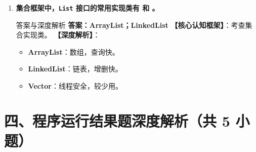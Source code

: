 \documentclass[12pt, a4paper]{ctexart}
\newcommand{\code}[1]{\texttt{#1}}
\newcommand{\blank}{\underline{\hspace{2em}}}
\begin{document}
\begin{enumerate}[label=\textbf{\arabic*.}, leftmargin=*, itemsep=1.5em]
\item \textbf{集合框架中，\code{List} 接口的常用实现类有 \blank 和 \blank。}
\begin{bluebox}{答案与深度解析}
\textbf{答案：ArrayList；LinkedList}
\textbf{【核心认知框架】}：考查集合实现类。
\textbf{【深度解析】}：
\begin{itemize}[leftmargin=*, nosep]
    \item \textbf{ArrayList}：数组，查询快。
    \item \textbf{LinkedList}：链表，增删快。
    \item \textbf{Vector}：线程安全，较少用。
\end{itemize}
\end{bluebox}
\end{enumerate}

\section*{四、程序运行结果题深度解析（共 5 小题）}
\end{document}
